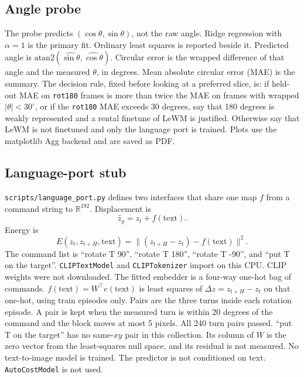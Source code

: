 \documentclass[11pt,a4paper]{article}
\begin{document}
\subsection{Angle probe}
The probe predicts $(\cos\theta,\sin\theta)$, not the raw angle.
Ridge regression with $\alpha=1$ is the primary fit.
Ordinary least squares is reported beside it.
Predicted angle is $\mathrm{atan2}(\widehat{\sin\theta},\widehat{\cos\theta})$.
Circular error is the wrapped difference of that angle and the measured $\theta$, in degrees.
Mean absolute circular error (MAE) is the summary.
The decision rule, fixed before looking at a preferred slice, is: if held-out MAE on \texttt{rot180} frames is more than twice the MAE on frames with wrapped $|\theta|<30^{\circ}$, or if the \texttt{rot180} MAE exceeds 30 degrees, say that 180 degrees is weakly represented and a rental finetune of LeWM is justified.
Otherwise say that LeWM is not finetuned and only the language port is trained.
Plots use the matplotlib Agg backend and are saved as PDF.

\subsection{Language-port stub}
\texttt{scripts/language\_port.py} defines two interfaces that share one map $f$ from a command string to $\mathbb{R}^{192}$.
Displacement is
\begin{equation}
\hat{z}_{g} = z_{t} + f(\mathrm{text}).
\end{equation}
Energy is
\begin{equation}
E(z_{t}, z_{t+H}, \mathrm{text})
= \lVert (z_{t+H}-z_{t}) - f(\mathrm{text}) \rVert^{2}.
\end{equation}
The command list is ``rotate T 90'', ``rotate T 180'', ``rotate T -90'', and ``put T on the target''.
\texttt{CLIPTextModel} and \texttt{CLIPTokenizer} import on this CPU.
CLIP weights were not downloaded.
The fitted embedder is a four-way one-hot bag of commands.
$f(\mathrm{text})=W^{\top}e(\mathrm{text})$ is least squares of $\Delta z=z_{t+H}-z_{t}$ on that one-hot, using train episodes only.
Pairs are the three turns inside each rotation episode.
A pair is kept when the measured turn is within 20 degrees of the command and the block moves at most 5 pixels.
All 240 turn pairs passed.
``put T on the target'' has no same-$xy$ pair in this collection.
Its column of $W$ is the zero vector from the least-squares null space, and its residual is not measured.
No text-to-image model is trained.
The predictor is not conditioned on text.
\texttt{AutoCostModel} is not used.
\end{document}
